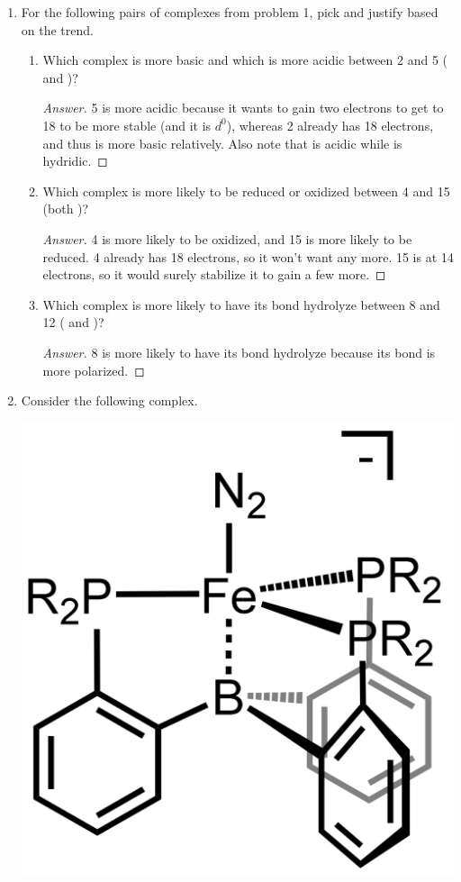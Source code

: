 \documentclass[../psets.tex]{subfiles}
\begin{document}
\begin{enumerate}
\begin{enumerate}[label={\arabic*)}]
\begin{proof}[Answer]
\begin{enumerate}[label={(\roman*)}]
                \item {} is $d^8$.
                \item The ligand is a 6-electron donor (2 dative bonds plus 2 covalent bonds). This combined with the above result yields $6+10=16$ as the electron count.
            \end{enumerate}
        \end{proof}
    \end{enumerate}
    \newpage
    \item For the following pairs of complexes from problem 1, pick and justify based on the trend.
    \begin{enumerate}[label={\alph*)}]
        \item Which complex is more basic and which is more acidic between 2 and 5 ( and )?
        \begin{proof}[Answer]
            5 is more acidic because it wants to gain two electrons to get to 18 to be more stable (and it is $d^0$), whereas 2 already has 18 electrons, and thus is more basic relatively. Also note that  is acidic while  is hydridic.
        \end{proof}
        \item Which complex is more likely to be reduced or oxidized between 4 and 15 (both )?
        \begin{proof}[Answer]
            4 is more likely to be oxidized, and 15 is more likely to be reduced. 4 already has 18 electrons, so it won't want any more. 15 is at 14 electrons, so it would surely stabilize it to gain a few more.
        \end{proof}
        \item Which complex is more likely to have its  bond hydrolyze between 8 and 12 ( and )?
        \begin{proof}[Answer]
            8 is more likely to have its  bond hydrolyze because its  bond is more polarized.
        \end{proof}
    \end{enumerate}
    \item Consider the following complex.
    \begin{center}
        \includegraphics[width=0.23\linewidth]{../ExtFiles/pset1-3.png}

\end{center}
\end{enumerate}
\end{document}
